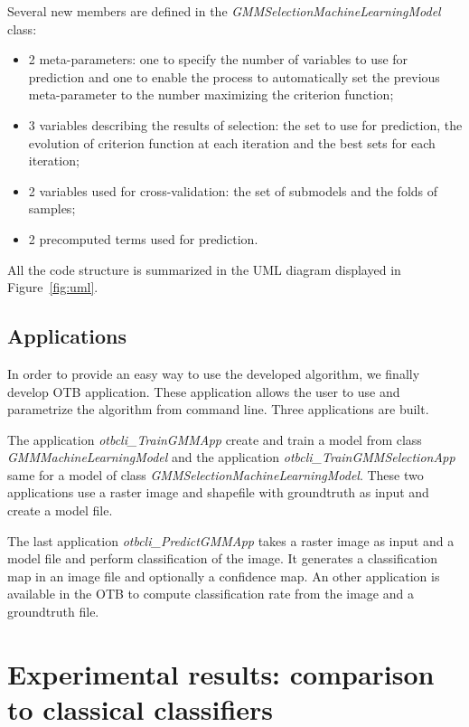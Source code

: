 \documentclass[a4paper,11pt,DIV=16,abstracton]{scrartcl}
\begin{document}
    Several new members are defined in the \emph{GMMSelectionMachineLearningModel} class:
    \begin{itemize}
        \item 2 meta-parameters: one to specify the number of variables to use for prediction and one to enable the process to automatically set the previous meta-parameter to the number maximizing the criterion function;
        \item 3 variables describing the results of selection: the set to use for prediction, the evolution of criterion function at each iteration and the best sets for each iteration;
        \item 2 variables used for cross-validation: the set of submodels and the folds of samples;
        \item 2 precomputed terms used for prediction.
    \end{itemize}

    All the code structure is summarized in the UML diagram displayed in Figure~\ref{fig:uml}.

    \subsection{Applications}

    In order to provide an easy way to use the developed algorithm, we finally develop OTB application. These application allows the user to use and parametrize the algorithm from command line. Three applications are built.

    The application \emph{otbcli\_TrainGMMApp} create and train a model from class \emph{GMMMachineLearningModel} and the application \emph{otbcli\_TrainGMMSelectionApp} same for a model of class \emph{GMMSelectionMachineLearningModel}. These two applications use a raster image and shapefile with groundtruth as input and create a model file.

    The last application \emph{otbcli\_PredictGMMApp} takes a raster image as input and a model file and perform classification of the image. It generates a classification map in an image file and optionally a confidence map. An other application is available in the OTB to compute classification rate from the image and a groundtruth file.

\section{Experimental results: comparison to classical classifiers}
\label{sec:exp-otb}
\end{document}
